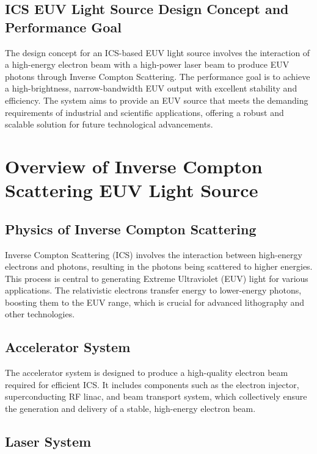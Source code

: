 \documentclass[10pt]{article}
\newcommand{\blankline}{\quad\pagebreak[3]}
\begin{document}
  \subsection{ICS EUV Light Source Design Concept and Performance Goal}
  
  The design concept for an ICS-based EUV light source involves the interaction of a high-energy electron beam with a high-power laser beam to produce EUV photons through Inverse Compton Scattering. The performance goal is to achieve a high-brightness, narrow-bandwidth EUV output with excellent stability and efficiency. The system aims to provide an EUV source that meets the demanding requirements of industrial and scientific applications, offering a robust and scalable solution for future technological advancements.


\blankline
\blankline

\section{Overview of Inverse Compton Scattering EUV Light Source}

  \subsection{Physics of Inverse Compton Scattering}
  
  Inverse Compton Scattering (ICS) involves the interaction between high-energy electrons and photons, resulting in the photons being scattered to higher energies. This process is central to generating Extreme Ultraviolet (EUV) light for various applications. The relativistic electrons transfer energy to lower-energy photons, boosting them to the EUV range, which is crucial for advanced lithography and other technologies.
  
  
  \subsection{Accelerator System}
  
  The accelerator system is designed to produce a high-quality electron beam required for efficient ICS. It includes components such as the electron injector, superconducting RF linac, and beam transport system, which collectively ensure the generation and delivery of a stable, high-energy electron beam.
  
  
  \subsection{Laser System}
  
\end{document}

